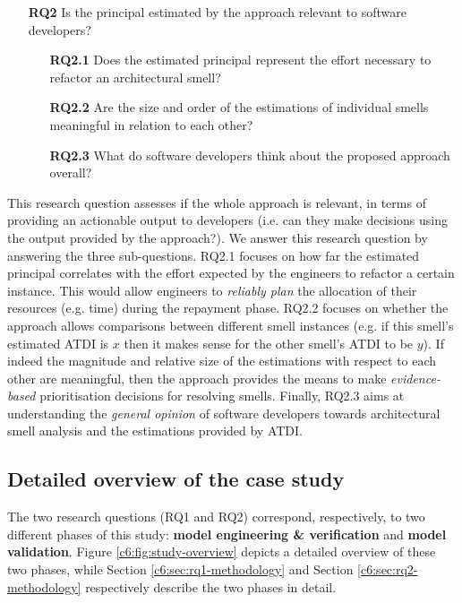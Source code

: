 \begin{itemize}
    \item[\textbf{RQ2}] Is the principal estimated by the approach relevant to software developers?    
    \begin{itemize}
        \item[\textbf{RQ2.1}] Does the estimated principal represent the effort necessary to refactor an architectural smell?
        \item[\textbf{RQ2.2}] Are the size and order of the estimations of individual smells meaningful in relation to each other? 
        \item[\textbf{RQ2.3}] What do software developers think about the proposed approach overall?
    \end{itemize} 
\end{itemize}
This research question assesses if the whole approach is relevant, in terms of providing an actionable output to developers (i.e. can they make decisions using the output provided by the approach?).
We answer this research question by answering the three sub-questions.
RQ2.1 focuses on how far the estimated principal correlates with the effort expected by the engineers to refactor a certain instance. 
This would allow engineers to \emph{reliably plan} the allocation of their resources (e.g. time) during the repayment phase.
RQ2.2 focuses on whether the approach allows comparisons between different smell instances (e.g. if this smell's estimated ATDI is $x$ then it makes sense for the other smell's ATDI to be $y$).
If indeed the magnitude and relative size of the estimations with respect to each other are meaningful, then the approach provides the means to make \emph{evidence-based} prioritisation decisions for resolving smells.
Finally, RQ2.3 aims at understanding the \emph{general opinion} of software developers towards architectural smell analysis and the estimations provided by ATDI.

\subsection{Detailed overview of the case study}
The two research questions (RQ1 and RQ2) correspond, respectively, to two different phases of this study: \textbf{model engineering \& verification} and \textbf{model validation}.
Figure \ref{c6:fig:study-overview} depicts a detailed overview of these two phases, while Section \ref{c6:sec:rq1-methodology} and Section \ref{c6:sec:rq2-methodology} respectively describe the two phases in detail.

